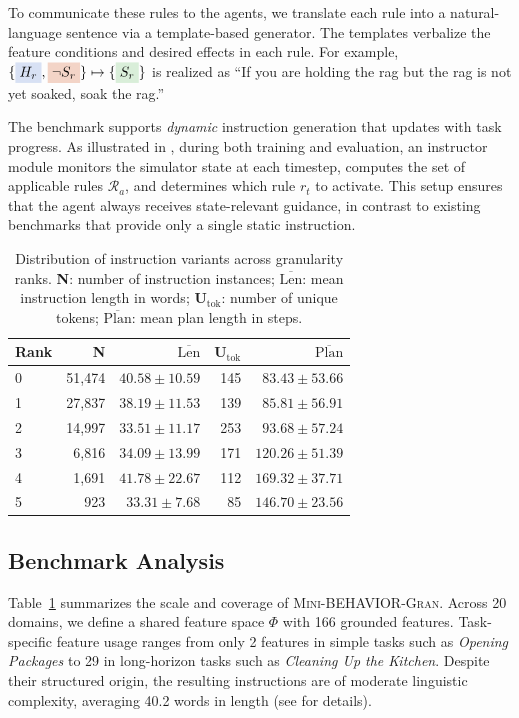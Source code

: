 \documentclass[11pt]{article}
\newcommand{\hlA}[1]{\colorbox{RoyalBlue!15}{#1}}
\newcommand{\hlB}[1]{\colorbox{BrickRed!15}{#1}}
\newcommand{\hlC}[1]{\colorbox{ForestGreen!15}{#1}}
\begin{document}
To communicate these rules to the agents, we translate each rule into a natural-language sentence via a template-based generator. The templates verbalize the feature conditions and desired effects in each rule. For example, $\{\hlA{$H_r$}, \hlB{$\neg S_r$}\} \mapsto \{\hlC{$S_r$}\}$ is realized as ``If you are \hlA{holding the rag} but \hlB{the rag is not yet soaked}, \hlC{soak the rag}.''

The benchmark supports \emph{dynamic} instruction generation that updates with task progress. As illustrated in , during both training and evaluation, an instructor module monitors the simulator state at each timestep, computes the set of applicable rules $\mathcal{R}_a$, and determines which rule $r_t$ to activate. This setup ensures that the agent always receives state-relevant guidance, in contrast to existing benchmarks \citep{DBLP:conf/corl/0002ZWGSMWLLSAH22, fei2025liberoplus} that provide only a single static instruction. 

\begin{table}[t]
\centering
\scriptsize
\begin{tabular}{lrrrr}
\toprule
\textbf{Rank} & \textbf{N} & $\overline{\text{Len}}$ & $\textbf{U}_{\text{tok}}$ & $\overline{\text{Plan}}$  \\
\midrule
0 & 51,474 & $40.58 \pm 10.59$ & 145 & $83.43 \pm 53.66$  \\
1 & 27,837 & $38.19 \pm 11.53$ & 139 & $85.81 \pm 56.91$  \\
2 & 14,997 & $33.51 \pm 11.17$ & 253 & $93.68 \pm 57.24$  \\
3 & 6,816  & $34.09 \pm 13.99$ & 171 & $120.26 \pm 51.39$  \\
4 & 1,691  & $41.78 \pm 22.67$ & 112 & $169.32 \pm 37.71$  \\
5 & 923    & $33.31 \pm  7.68$ & 85  & $146.70 \pm 23.56$  \\
\bottomrule
\end{tabular}
\caption{Distribution of instruction variants across granularity ranks. \textbf{N}: number of instruction instances; $\overline{\text{Len}}$: mean instruction length in words; $\textbf{U}_{\text{tok}}$: number of unique tokens; $\overline{\text{Plan}}$: mean plan length in steps.}
\label{tab:instruction_stats_main}
\end{table}

\subsection{Benchmark Analysis}
Table~\ref{tab:instruction_stats_main} summarizes the scale and coverage of \textsc{Mini-BEHAVIOR-Gran}. 
Across 20 domains, we define a shared feature space $\Phi$ with 166 grounded features. 
Task-specific feature usage ranges from only 2 features in simple tasks such as \emph{Opening Packages} to 29 in long-horizon tasks such as \emph{Cleaning Up the Kitchen}. 
Despite their structured origin, the resulting instructions are of moderate linguistic complexity, averaging 40.2 words in length (see  for details).
\end{document}
